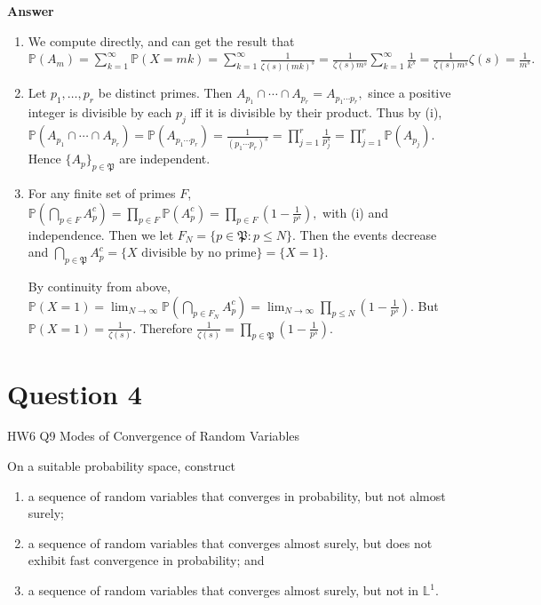 \documentclass[letterpaper]{article}
\begin{document}
		\textbf{Answer}
		
		\begin{enumerate}
			
			\item[(i)] We compute directly, and can get the result that
			$
			\mathbb{P}(A_m)
			=
			\sum_{k=1}^{\infty}\mathbb{P}(X=mk)
			=
			\sum_{k=1}^{\infty}\frac{1}{\zeta(s)(mk)^s}
			=
			\frac{1}{\zeta(s)m^s}\sum_{k=1}^{\infty}\frac{1}{k^s}
			=
			\frac{1}{\zeta(s)m^s}\zeta(s)
			=
			\frac{1}{m^s}.
			$
			
			\item[(ii)] Let $p_1,\dots,p_r$ be distinct primes. Then
			$
			A_{p_1}\cap\cdots\cap A_{p_r}
			=
			A_{p_1\cdots p_r},
			$
			since a positive integer is divisible by each $p_j$ iff it is divisible by their product.
			Thus by (i),
			$
			\mathbb{P}(A_{p_1}\cap\cdots\cap A_{p_r})
			=
			\mathbb{P}(A_{p_1\cdots p_r})
			=
			\frac{1}{(p_1\cdots p_r)^s}
			=
			\prod_{j=1}^r \frac{1}{p_j^s}
			=
			\prod_{j=1}^r \mathbb{P}(A_{p_j}).
			$
			Hence $\{A_p\}_{p\in\mathfrak P}$ are independent.
			
			\item[(iii)] For any finite set of primes $F$,
			$
			\mathbb{P}\!\left(\bigcap_{p\in F}A_p^c\right)
			=
			\prod_{p\in F}\mathbb{P}(A_p^c)
			=
			\prod_{p\in F}\left(1-\frac{1}{p^s}\right),
			$
			with (i) and independence. Then we let $F_N=\{p\in\mathfrak P: p\le N\}$. Then the events decrease and
			$
			\bigcap_{p\in\mathfrak P}A_p^c
			=
			\{X\text{ divisible by no prime}\}
			=
			\{X=1\}.
			$
			
			By continuity from above,
			$
			\mathbb{P}(X=1)
			=
			\lim_{N\to\infty}
			\mathbb{P}\!\left(\bigcap_{p\in F_N}A_p^c\right)
			=
			\lim_{N\to\infty}
			\prod_{p\le N}\left(1-\frac{1}{p^s}\right).
			$
			But
			$
			\mathbb{P}(X=1)=\frac{1}{\zeta(s)}.
			$
			Therefore
			$
			\frac{1}{\zeta(s)}
			=
			\prod_{p\in\mathfrak P}\left(1-\frac{1}{p^s}\right).
			$
			
		\end{enumerate}
		
		\clearpage
		
		\section{Question 4}
		
		{\color{deepred} HW6 Q9 Modes of Convergence of Random Variables}
		
		On a suitable probability space, construct
		\begin{enumerate}
			\item[(i)] a sequence of random variables that converges in probability, but not almost surely;
			
			\item[(ii)] a sequence of random variables that converges almost surely, but does not exhibit fast convergence in probability; and
			
			\item[(iii)] a sequence of random variables that converges almost surely, but not in $\mathbb{L}^{1}$.
		\end{enumerate}
		
\end{document}
